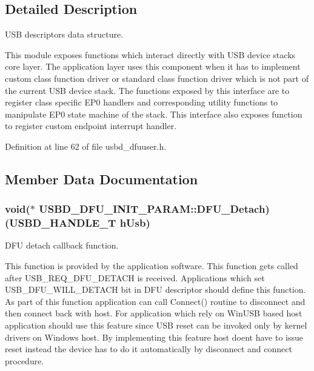 \subsection{Detailed Description}
U\+SB descriptors data structure. 

This module exposes functions which interact directly with U\+SB device stack\textquotesingle{}s core layer. The application layer uses this component when it has to implement custom class function driver or standard class function driver which is not part of the current U\+SB device stack. The functions exposed by this interface are to register class specific E\+P0 handlers and corresponding utility functions to manipulate E\+P0 state machine of the stack. This interface also exposes function to register custom endpoint interrupt handler. 

Definition at line 62 of file usbd\+\_\+dfuuser.\+h.



\subsection{Member Data Documentation}
\subsubsection[{\texorpdfstring{D\+F\+U\+\_\+\+Detach}{DFU_Detach}}]{\setlength{\rightskip}{0pt plus 5cm}void($\ast$ U\+S\+B\+D\+\_\+\+D\+F\+U\+\_\+\+I\+N\+I\+T\+\_\+\+P\+A\+R\+A\+M\+::\+D\+F\+U\+\_\+\+Detach) ({\bf U\+S\+B\+D\+\_\+\+H\+A\+N\+D\+L\+E\+\_\+T} h\+Usb)}\hypertarget{structUSBD__DFU__INIT__PARAM_ae4467d347854eaab0b352aa5cdef7a74}{}\label{structUSBD__DFU__INIT__PARAM_ae4467d347854eaab0b352aa5cdef7a74}
D\+FU detach callback function.

This function is provided by the application software. This function gets called after U\+S\+B\+\_\+\+R\+E\+Q\+\_\+\+D\+F\+U\+\_\+\+D\+E\+T\+A\+CH is received. Applications which set U\+S\+B\+\_\+\+D\+F\+U\+\_\+\+W\+I\+L\+L\+\_\+\+D\+E\+T\+A\+CH bit in D\+FU descriptor should define this function. As part of this function application can call Connect() routine to disconnect and then connect back with host. For application which rely on Win\+U\+SB based host application should use this feature since U\+SB reset can be invoked only by kernel drivers on Windows host. By implementing this feature host doen\textquotesingle{}t have to issue reset instead the device has to do it automatically by disconnect and connect procedure.



